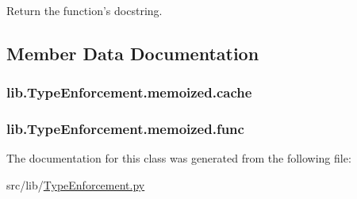 \begin{DoxyVerb}Return the function's docstring.\end{DoxyVerb}
 

\subsection{Member Data Documentation}
\hypertarget{classlib_1_1_type_enforcement_1_1memoized_ae63e85bcde7d084f05df9b5e6625a3ca}{
\subsubsection[{cache}]{\setlength{\rightskip}{0pt plus 5cm}lib.\-Type\-Enforcement.\-memoized.\-cache}}\label{classlib_1_1_type_enforcement_1_1memoized_ae63e85bcde7d084f05df9b5e6625a3ca}
\hypertarget{classlib_1_1_type_enforcement_1_1memoized_a23ed1db05357f8380e209aaacccaba3d}{
\subsubsection[{func}]{\setlength{\rightskip}{0pt plus 5cm}lib.\-Type\-Enforcement.\-memoized.\-func}}\label{classlib_1_1_type_enforcement_1_1memoized_a23ed1db05357f8380e209aaacccaba3d}


The documentation for this class was generated from the following file\-:\begin{DoxyCompactItemize}
\item 
src/lib/\hyperlink{_type_enforcement_8py}{Type\-Enforcement.\-py}\end{DoxyCompactItemize}
